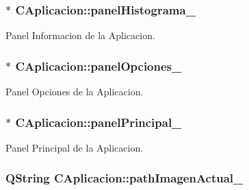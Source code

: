 \subsubsection[{\texorpdfstring{panel\+Histograma\+\_\+}{panelHistograma_}}]{$\ast$ C\+Aplicacion\+::panel\+Histograma\+\_\+\hspace{0.3cm}{\ttfamily [private]}}\hypertarget{classCAplicacion_a5edbe0644420ff42d80a2a5d247c69eb}{}\label{classCAplicacion_a5edbe0644420ff42d80a2a5d247c69eb}


Panel Informacion de la Aplicacion. 

\subsubsection[{\texorpdfstring{panel\+Opciones\+\_\+}{panelOpciones_}}]{$\ast$ C\+Aplicacion\+::panel\+Opciones\+\_\+\hspace{0.3cm}{\ttfamily [private]}}\hypertarget{classCAplicacion_adc38c4ae217096b72da9911d6cf39f47}{}\label{classCAplicacion_adc38c4ae217096b72da9911d6cf39f47}


Panel Opciones de la Aplicacion. 

\subsubsection[{\texorpdfstring{panel\+Principal\+\_\+}{panelPrincipal_}}]{$\ast$ C\+Aplicacion\+::panel\+Principal\+\_\+\hspace{0.3cm}{\ttfamily [private]}}\hypertarget{classCAplicacion_ac795b4ce529859a5d5c03e15ed78d967}{}\label{classCAplicacion_ac795b4ce529859a5d5c03e15ed78d967}


Panel Principal de la Aplicacion. 

\subsubsection[{\texorpdfstring{path\+Imagen\+Actual\+\_\+}{pathImagenActual_}}]{\setlength{\rightskip}{0pt plus 5cm}Q\+String C\+Aplicacion\+::path\+Imagen\+Actual\+\_\+\hspace{0.3cm}{\ttfamily [private]}}\hypertarget{classCAplicacion_a990b6780cd5e1d941f01e7df20958587}{}\label{classCAplicacion_a990b6780cd5e1d941f01e7df20958587}


